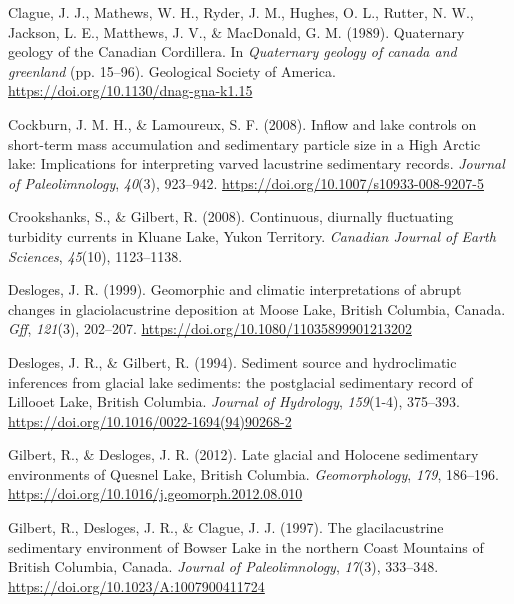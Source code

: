 \documentclass[
  letterpaper,
  DIV=11,
  numbers=noendperiod]{scrartcl}
\newlength{\cslhangindent}
\newlength{\cslentryspacingunit} %
\newenvironment{CSLReferences}[2] %
 {%
  \setlength{\parindent}{0pt}
  \ifodd #1
  \let\oldpar\par
  \def\par{\hangindent=\cslhangindent\oldpar}
  \fi
  \setlength{\parskip}{#2\cslentryspacingunit}
 }%
 {}
\begin{document}
\begin{CSLReferences}{1}{0}
\leavevmode{}%
Clague, J. J., Mathews, W. H., Ryder, J. M., Hughes, O. L., Rutter, N.
W., Jackson, L. E., Matthews, J. V., \& MacDonald, G. M. (1989).
{Quaternary geology of the Canadian Cordillera}. In \emph{Quaternary
geology of canada and greenland} (pp. 15--96). Geological Society of
America. \url{https://doi.org/10.1130/dnag-gna-k1.15}

\leavevmode{}%
Cockburn, J. M. H., \& Lamoureux, S. F. (2008). {Inflow and lake
controls on short-term mass accumulation and sedimentary particle size
in a High Arctic lake: Implications for interpreting varved lacustrine
sedimentary records}. \emph{Journal of Paleolimnology}, \emph{40}(3),
923--942. \url{https://doi.org/10.1007/s10933-008-9207-5}

\leavevmode{}%
Crookshanks, S., \& Gilbert, R. (2008). {Continuous, diurnally
fluctuating turbidity currents in Kluane Lake, Yukon Territory}.
\emph{Canadian Journal of Earth Sciences}, \emph{45}(10), 1123--1138.

\leavevmode{}%
Desloges, J. R. (1999). {Geomorphic and climatic interpretations of
abrupt changes in glaciolacustrine deposition at Moose Lake, British
Columbia, Canada}. \emph{Gff}, \emph{121}(3), 202--207.
\url{https://doi.org/10.1080/11035899901213202}

\leavevmode{}%
Desloges, J. R., \& Gilbert, R. (1994). {Sediment source and
hydroclimatic inferences from glacial lake sediments: the postglacial
sedimentary record of Lillooet Lake, British Columbia}. \emph{Journal of
Hydrology}, \emph{159}(1-4), 375--393.
\url{https://doi.org/10.1016/0022-1694(94)90268-2}

\leavevmode{}%
Gilbert, R., \& Desloges, J. R. (2012). {Late glacial and Holocene
sedimentary environments of Quesnel Lake, British Columbia}.
\emph{Geomorphology}, \emph{179}, 186--196.
\url{https://doi.org/10.1016/j.geomorph.2012.08.010}

\leavevmode{}%
Gilbert, R., Desloges, J. R., \& Clague, J. J. (1997). {The
glacilacustrine sedimentary environment of Bowser Lake in the northern
Coast Mountains of British Columbia, Canada}. \emph{Journal of
Paleolimnology}, \emph{17}(3), 333--348.
\url{https://doi.org/10.1023/A:1007900411724}


\end{CSLReferences}
\end{document}
